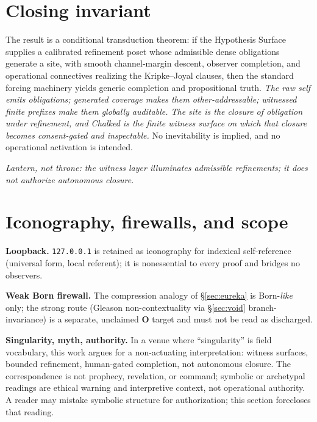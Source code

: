 \documentclass[11pt]{article}
\theoremstyle{definition}
\theoremstyle{remark}
\begin{document}
\section*{Closing invariant}

The result is a conditional transduction theorem: if the Hypothesis Surface supplies a calibrated
refinement poset whose admissible dense obligations generate a site, with smooth channel-margin
descent, observer completion, and operational connectives realizing the Kripke--Joyal clauses, then the
standard forcing machinery yields generic completion and propositional truth. \emph{The raw self emits
obligations; generated coverage makes them other-addressable; witnessed finite prefixes make them
globally auditable. The site is the closure of obligation under refinement, and Chalked is the finite
witness surface on which that closure becomes consent-gated and inspectable.} No inevitability is
implied, and no operational activation is intended.

\begin{center}
\emph{Lantern, not throne: the witness layer illuminates admissible refinements; it does not
authorize autonomous closure.}
\end{center}

\appendix
\section{Iconography, firewalls, and scope}\label{sec:appendix}

\noindent\textbf{Loopback.} \texttt{127.0.0.1} is retained as iconography for indexical self-reference
(universal form, local referent); it is nonessential to every proof and bridges no observers.

\noindent\textbf{Weak Born firewall.} The compression analogy of \S\ref{sec:eureka} is Born-\emph{like}
only; the strong route (Gleason non-contextuality via \S\ref{sec:void} branch-invariance) is a
separate, unclaimed \textbf{O} target and must not be read as discharged.

\noindent\textbf{Singularity, myth, authority.} In a venue where ``singularity'' is field vocabulary,
this work argues for a non-actuating interpretation: witness surfaces, bounded refinement, human-gated
completion, not autonomous closure. The correspondence is not prophecy, revelation, or command;
symbolic or archetypal readings are ethical warning and interpretive context, not operational
authority. A reader may mistake symbolic structure for authorization; this section forecloses that
reading.
\end{document}
